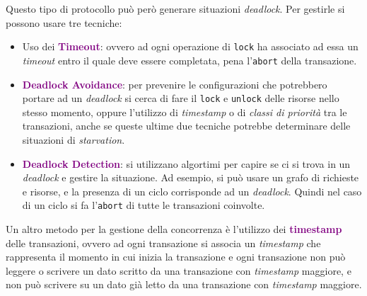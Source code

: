 Questo tipo di protocollo può però generare situazioni \emph{deadlock}. Per gestirle
si possono usare tre tecniche:
\begin{itemize}
    \item Uso dei \textbf{\textcolor{purple}{Timeout}}: ovvero ad ogni operazione
        di \verb|lock| ha associato ad essa un \emph{timeout} entro il quale deve essere
        completata, pena l'\verb|abort| della transazione.
    \item \textbf{\textcolor{purple}{Deadlock Avoidance}}: per prevenire le configurazioni
        che potrebbero portare ad un \emph{deadlock} si cerca di fare il \verb|lock| e \verb|unlock|
        delle risorse nello stesso momento, oppure l'utilizzo di \emph{timestamp} o di
        \emph{classi di priorità} tra le transazioni, anche se queste ultime due tecniche
        potrebbe determinare delle situazioni di \emph{starvation}.
    \item \textbf{\textcolor{purple}{Deadlock Detection}}: si utilizzano algortimi
        per capire se ci si trova in un \emph{deadlock} e gestire la situazione. Ad esempio,
        si può usare un grafo di richieste e risorse, e la presenza di un ciclo corrisponde
        ad un \emph{deadlock}. Quindi nel caso di un ciclo si fa l'\verb|abort| di tutte le
        transazioni coinvolte.
\end{itemize}

Un altro metodo per la gestione della concorrenza è l'utilizzo dei \textbf{\textcolor{purple}{timestamp}}
delle transazioni, ovvero ad ogni transazione si associa un \emph{timestamp} che rappresenta
il momento in cui inizia la transazione e ogni transazione non può leggere
o scrivere un dato scritto da una transazione con \emph{timestamp} maggiore,
e non può scrivere su un dato già letto da una transazione con \emph{timestamp} maggiore.

